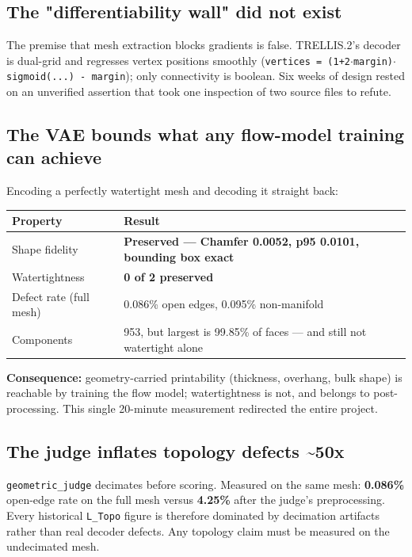 \documentclass[11pt,a4paper]{article}
\newcommand{\good}[1]{\textcolor{good}{\textbf{#1}}}
\newcommand{\bad}[1]{\textcolor{bad}{\textbf{#1}}}
\begin{document}
\subsection{The "differentiability wall" did not exist}
The premise that mesh extraction blocks gradients is false. TRELLIS.2's decoder is dual-grid and
regresses vertex positions smoothly (\texttt{vertices = (1+2$\cdot$margin)$\cdot$sigmoid(...) - margin});
only connectivity is boolean. Six weeks of design rested on an unverified assertion that took one
inspection of two source files to refute.

\subsection{The VAE bounds what any flow-model training can achieve}
Encoding a perfectly watertight mesh and decoding it straight back:

\begin{center}\small
\begin{tabular}{@{}ll@{}}
\toprule
\textbf{Property} & \textbf{Result} \\
\midrule
Shape fidelity & \good{Preserved --- Chamfer 0.0052, p95 0.0101, bounding box exact} \\
Watertightness & \bad{0 of 2 preserved} \\
Defect rate (full mesh) & 0.086\% open edges, 0.095\% non-manifold \\
Components & 953, but largest is 99.85\% of faces --- and still not watertight alone \\
\bottomrule
\end{tabular}
\end{center}
\textbf{Consequence:} geometry-carried printability (thickness, overhang, bulk shape) is reachable by
training the flow model; watertightness is not, and belongs to post-processing. This single 20-minute
measurement redirected the entire project.

\subsection{The judge inflates topology defects \textasciitilde{}50x}
\texttt{geometric\_judge} decimates before scoring. Measured on the same mesh: \textbf{0.086\%} open-edge
rate on the full mesh versus \textbf{4.25\%} after the judge's preprocessing. Every historical
\texttt{L\_Topo} figure is therefore dominated by decimation artifacts rather than real decoder
defects. Any topology claim must be measured on the undecimated mesh.
\end{document}
